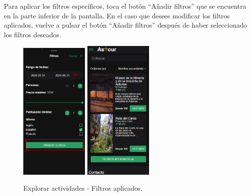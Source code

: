 Para aplicar los filtros específicos, toca el botón “Añadir filtros” que se encuentra en la parte inferior de la pantalla.
En el caso que desees modificar los filtros aplicados, vuelve a pulsar el botón “Añadir filtros” después de haber seleccionado los filtros deseados.
\begin{figure}[H]
	\centering
	\includegraphics[width=0.3\textwidth]{7-Construccion/Manuales/mobile/aplicar filtro.png}
	\includegraphics[width=0.3\textwidth]{7-Construccion/Manuales/mobile/lista filtrada de actividades.png}
	\caption{Explorar actividades - Filtros aplicados.}
\end{figure}

